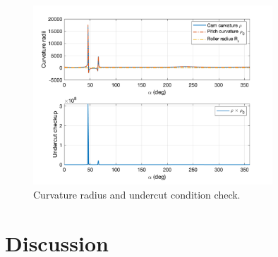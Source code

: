 \documentclass[12pt]{scrartcl}
\begin{document}
\begin{figure}[htbp!]
	\centering
	\includegraphics[width=0.8\textwidth]{Pictures/undercutCondition}
	\caption{Curvature radius and undercut condition check.}
	\label{fig: curvature}
\end{figure}


\FloatBarrier
\section{Discussion}
\end{document}
